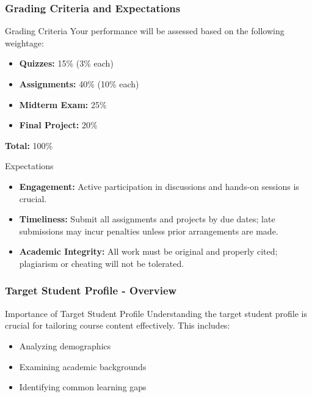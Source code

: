 \documentclass[aspectratio=169]{beamer}
\begin{document}
\begin{frame}[fragile]
    \frametitle{Grading Criteria and Expectations}
    \begin{block}{Grading Criteria}
        Your performance will be assessed based on the following weightage:
        \begin{itemize}
            \item \textbf{Quizzes:} 15\% (3\% each)
            \item \textbf{Assignments:} 40\% (10\% each)
            \item \textbf{Midterm Exam:} 25\%
            \item \textbf{Final Project:} 20\%
        \end{itemize}
        \textbf{Total:} 100\%
    \end{block}

    \begin{block}{Expectations}
        \begin{itemize}
            \item \textbf{Engagement:} Active participation in discussions and hands-on sessions is crucial.
            \item \textbf{Timeliness:} Submit all assignments and projects by due dates; late submissions may incur penalties unless prior arrangements are made.
            \item \textbf{Academic Integrity:} All work must be original and properly cited; plagiarism or cheating will not be tolerated.
        \end{itemize}
    \end{block}
\end{frame}

\begin{frame}[fragile]
    \frametitle{Target Student Profile - Overview}
    \begin{block}{Importance of Target Student Profile}
        Understanding the target student profile is crucial for tailoring course content effectively. This includes:
    \end{block}
    \begin{itemize}
        \item Analyzing demographics
        \item Examining academic backgrounds
        \item Identifying common learning gaps
    \end{itemize}
\end{frame}
\end{document}
